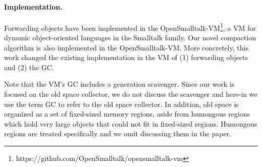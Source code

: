 \documentclass[sigplan,10pt,review,anonymous]{acmart}\settopmatter{printfolios=true,printccs=false,printacmref=false}
\def\OpenSmalltalkVM{OpenSmalltalk-VM\xspace}
\begin{document}
\paragraph{Implementation.} Forwarding objects have been implemented in the \OpenSmalltalkVM\footnote{https://github.com/OpenSmalltalk/opensmalltalk-vm}, a VM for dynamic object-oriented languages in the Smalltalk family.
Our novel compaction algorithm is also implemented in the \OpenSmalltalkVM. 
More concretely, this work changed the existing implementation in the VM of (1) forwarding objects and (2) the GC. 

Note that the VM's GC includes a generation scavenger. Since our work is focused on the old space collector, we do not discuss the scavenger and here-in we use the term GC to refer to the old space collector. In addition, old space is organized as a set of fixed-sized memory regions, aside from humongous regions which hold very large objects that could not fit in fixed-sized regions. Humongous regions are treated specifically and we omit discussing them in the paper.

\end{document}
